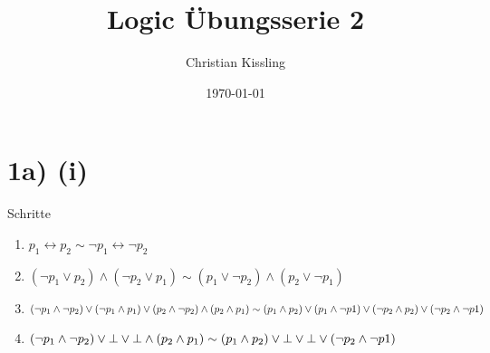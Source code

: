 \documentclass{article}
\title{Logic Übungsserie 2}
\author{Christian Kissling}
\date{\today}
\begin{document}
\maketitle

\section*{1a) (i)}
Schritte
\begin{enumerate}
    
\item $p_1 \leftrightarrow p_2 \sim \neg p_1 \leftrightarrow \neg p_2$

\item $(\neg p_1 \lor p_2) \land (\neg p_2 \lor p_1) \sim (p_1 \lor \neg p_2) \land (p_2 \lor \neg p_1) $

\item $(\neg p_1 \land \neg p_2) \lor (\neg p_1 \land p_1) \lor (p_2 \land \neg p_2) \land (p_2 \land p_1) \sim \\
(p_1 \land p_2) \lor (p_1 \land \neg p1) \lor (\neg p_2 \land p_2) \lor (\neg p_2 \land \neg p1)  $


\item $(\neg p_1 \land \neg p_2) \lor  \bot  \lor \bot \land (p_2 \land p_1) \sim \\
(p_1 \land p_2) \lor \bot \lor \bot \lor (\neg p_2 \land \neg p1)  $
\end{enumerate}
\end{document}
